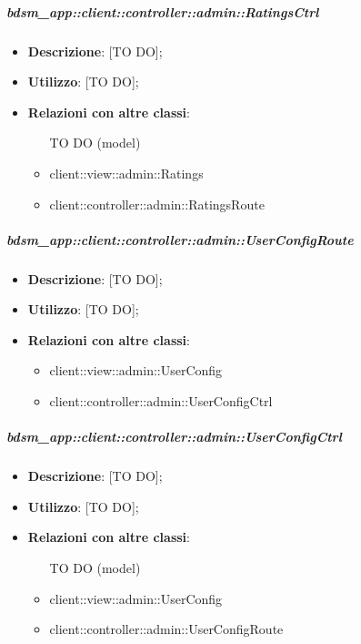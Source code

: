 		\subparagraph{bdsm\_app::client::controller::admin::RatingsCtrl} %
		\label{subp:bdsm_app_client_controller_admin_ratingsctrl}
			\begin{itemize}
				\item \textbf{Descrizione}: [TO DO];
				\item \textbf{Utilizzo}: [TO DO];
				\item \textbf{Relazioni con altre classi}:
					\begin{itemize}
						\item [TO DO] (model)
						\item client::view::admin::Ratings
						\item client::controller::admin::RatingsRoute
					\end{itemize}
			\end{itemize}

		\subparagraph{bdsm\_app::client::controller::admin::UserConfigRoute} %
		\label{subp:bdsm_app_client_controller_admin_userconfigroute}
			\begin{itemize}
				\item \textbf{Descrizione}: [TO DO];
				\item \textbf{Utilizzo}: [TO DO];
				\item \textbf{Relazioni con altre classi}:
					\begin{itemize}
						\item client::view::admin::UserConfig
						\item client::controller::admin::UserConfigCtrl
					\end{itemize}
			\end{itemize}

		\subparagraph{bdsm\_app::client::controller::admin::UserConfigCtrl} %
		\label{subp:bdsm_app_client_controller_admin_userconfigctrl}
			\begin{itemize}
				\item \textbf{Descrizione}: [TO DO];
				\item \textbf{Utilizzo}: [TO DO];
				\item \textbf{Relazioni con altre classi}:
					\begin{itemize}
						\item [TO DO] (model)
						\item client::view::admin::UserConfig
						\item client::controller::admin::UserConfigRoute
					\end{itemize}
			\end{itemize}


